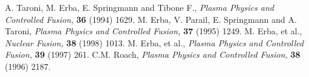 \documentclass{article}    %
\begin{document}
\begin{thebibliography}{99}
A. Taroni, M. Erba, E. Springmann and Tibone F.,
{\em Plasma Physics and Controlled Fusion,} {\bf 36} (1994) 1629.
M. Erba, V. Parail, E. Springmann and A. Taroni,
{\em Plasma Physics and Controlled Fusion,} {\bf 37} (1995) 1249.
M. Erba, et al.,
{\em Nuclear Fusion,} {\bf 38} (1998) 1013.
M. Erba, et al.,
{\em Plasma Physics and Controlled Fusion,} {\bf 39} (1997) 261.
C.M. Roach, 
{\em Plasma Physics and Controlled Fusion,} {\bf 38} (1996) 2187.
\end{thebibliography}
\end{document}
